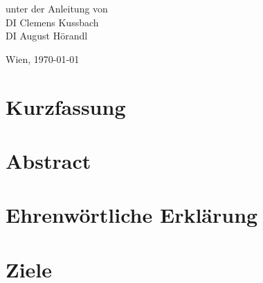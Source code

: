 \documentclass[
    headings=optiontotocandhead,%
    twoside,
    numbers=noenddot,%
    toc=flat, %
    12pt, %
    titlepage, %
    parskip=full, %
    listof=totoc, %
    listof=flat, %
    numbers=noenddot, %
    bibliography=totoc, %
    a4paper,DIV=14,
    BCOR=15mm,
]{scrbook}
\begin{document}
\begin{titlepage}
\begin{center}
\par\end{center}{\large \par}

\begin{center}
\vspace{20mm}
 \normalsize unter der Anleitung von\\
 \vspace{0.5cm}
DI Clemens Kussbach\\
DI August Hörandl
\par\end{center}

\begin{center}
\vspace{5mm}
Wien, \today 
\par\end{center}

\end{titlepage}%
\renewcommand{\kapitelautor}{}  %
\chapter*{Kurzfassung}

\cleardoublepage{}

\chapter*{Abstract}


\chapter*{Ehrenwörtliche Erklärung}


\cleardoublepage{}
\tableofcontents{}
\cleardoublepage{}
\listoffigures


\cleardoublepage{}
\mainmatter

\chapter{Ziele}
\end{document}
